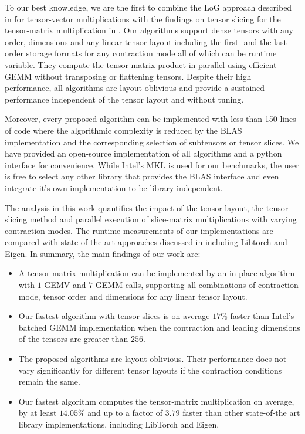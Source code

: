 To our best knowledge, we are the first to combine the LoG approach described in \citep{bassoy:2019:ttv, pawlowski:2019:morton.tensor.computations} for tensor-vector multiplications with the findings on tensor slicing for the tensor-matrix multiplication in \citep{li:2015:input}.
Our algorithms support dense tensors with any order, dimensions and any linear tensor layout including the first- and the last-order storage formats for any contraction mode all of which can be runtime variable.
They compute the tensor-matrix product in parallel using efficient GEMM without transposing or flattening tensors.
Despite their high performance, all algorithms are layout-oblivious and provide a sustained performance independent of the tensor layout and without tuning.

Moreover, every proposed algorithm can be implemented with less than 150 lines of  code where the algorithmic complexity is reduced by the BLAS implementation and the corresponding selection of subtensors or tensor slices.
We have provided an open-source  implementation of all algorithms and a python interface for convenience.
While Intel's MKL is used for our benchmarks, the user is free to select any other library that provides the BLAS interface and even integrate it's own implementation to be library independent.

The analysis in this work quantifies the impact of the tensor layout, the tensor slicing method and parallel execution of slice-matrix multiplications with varying contraction modes.
The runtime measurements of our implementations are compared with state-of-the-art approaches discussed in \citep{springer:2018:design, matthews:2018:high, paszke:2019:pytorch} including Libtorch and Eigen. In summary, the main findings of our work are:
\begin{itemize}
	\item 
	A tensor-matrix multiplication can be implemented by an in-place algorithm with $1$ GEMV and $7$ GEMM calls, supporting all combinations of contraction mode, tensor order and dimensions for any linear tensor layout.
	\item 
	Our fastest algorithm with tensor slices is on average $17$\% faster than Intel's batched GEMM implementation when the contraction and leading dimensions of the tensors are greater than $256$.
	\item 
	The proposed algorithms are layout-oblivious. 
	Their performance does not vary significantly for different tensor layouts if the contraction conditions remain the same.
	\item
	Our fastest algorithm computes the tensor-matrix multiplication on average, by at least $14.05$\% and up to a factor of $3.79$ faster than other state-of-the art library implementations, including LibTorch and Eigen.
\end{itemize}

